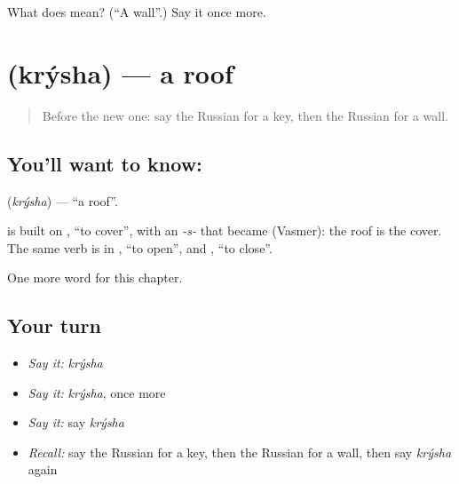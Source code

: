 \begin{tcolorbox}[breakable,colback=teal!4,colframe=teal!35!black,title={Before you move on}]
What does  mean? (\textquotedblleft{}A wall\textquotedblright{}.) Say it once more.
\end{tcolorbox}
\section[\texorpdfstring{\ru{крыша} (krýsha)}{крыша (krýsha)}]{ (krýsha) — a roof}

\label{lesson:RU-C50-roof}



\begin{quote}
Before the new one: say the Russian for a key, then the Russian for a wall.
\end{quote}

\subsection*{You'll want to know: }
\textbf{} (\emph{krýsha}) — \textquotedblleft{}a roof\textquotedblright{}.

\begin{cousinweb}
\textbf{} is built on \emph{}, \textquotedblleft{}to cover\textquotedblright{}, with an \emph{-s-} that became \emph{} (Vasmer): the roof is the cover. The same verb is in \emph{}, \textquotedblleft{}to open\textquotedblright{}, and \emph{}, \textquotedblleft{}to close\textquotedblright{}.
\end{cousinweb}

\begin{grammarlens}[title={What you've built}]
One more word for this chapter.
\end{grammarlens}

\subsection*{Your turn}
\begin{itemize}
\raggedright
  \item \emph{Say it:} \emph{krýsha}
  \item \emph{Say it:} \emph{krýsha}, once more
  \item \emph{Say it:} say \emph{krýsha}
  \item \emph{Recall:} say the Russian for a key, then the Russian for a wall, then say \emph{krýsha} again
\end{itemize}

